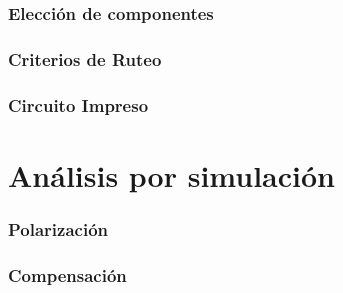 \documentclass[10pt,a4paper]{article}
\begin{document}
		\section{Elección de componentes}\label{sec:componentes}
			

		\section{Criterios de Ruteo}\label{sec:ruteo}
			

		\pagebreak
		\section{Circuito Impreso}
			
	\part{Análisis por simulación}\label{part:sim}
		
		\section{Polarización}\label{sec:sim_pol}
			
		
		\section{Compensación}\label{sec:sim_compensacion}
			
\end{document}
